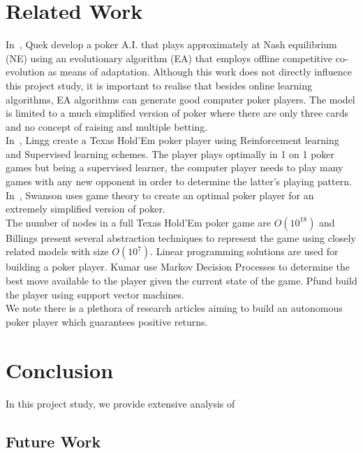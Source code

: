 \documentclass[12pt]{article}
\begin{document}
\section{Related Work}
\label{sec:related}
\noindent In~\cite{quek2009evolving}, Quek \etal develop a poker A.I. that plays approximately at Nash equilibrium (NE) using an
evolutionary algorithm (EA) that employs offline competitive co-evolution as means of adaptation. Although this work does not directly
influence this project study, it is important to realise that besides online learning algorithms, EA algorithms can generate
good computer poker players. The model is limited to a much simplified version of poker where there are only three cards
and no concept of raising and multiple betting.\\

\noindent In~\cite{stanford-report}, Lingg \etal create a Texas Hold'Em poker player using Reinforcement learning and Supervised learning schemes.
The player plays optimally in 1 on 1 poker games but being a supervised learner, the computer player needs to play many games with any
new opponent in order to determine the latter's playing pattern. In~\cite{swanson2005game}, Swanson \etal uses game theory to
create an optimal poker player for an extremely simplified version of poker.\\

\noindent The number of nodes in a full Texas Hold'Em poker game are $O(10^{18})$ and Billings \etal\cite{billings2003approximating} present
several abstraction techniques to represent the game using closely related models with size $O(10^7)$. Linear programming solutions are used for
building a poker player. Kumar \etal\cite{stanford-mdp} use Markov Decision Processes to determine the best move available to the player
given the current state of the game. Pfund \etal\cite{upenn-svm} build the player using support vector machines.\\

\noindent We note there is a plethora of research articles aiming to build an autonomous poker player which guarantees positive returns.

\section{Conclusion}
\label{sec:conclusion}
\noindent In this project study, we provide extensive analysis of 

\subsection{Future Work}



\end{document}
